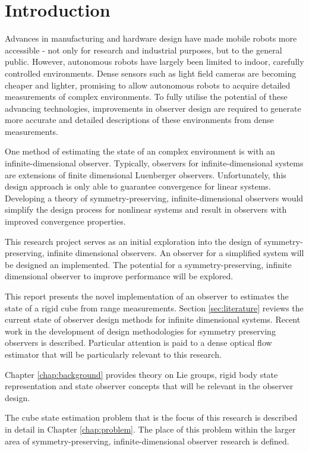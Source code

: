 \chapter{Introduction}

Advances in manufacturing and hardware design have made mobile robots more accessible - not only for research and industrial purposes, but to the general public. However, autonomous robots have largely been limited to indoor, carefully controlled environments. Dense sensors such as light field cameras are becoming cheaper and lighter, promising to allow autonomous robots to acquire detailed measurements of complex environments. To fully utilise the potential of these advancing technologies,  improvements in observer design are required to generate more accurate and detailed descriptions of these environments from dense measurements.

One method of estimating the state of an complex environment is with an infinite-dimensional observer. Typically, observers for infinite-dimensional systems are extensions of finite dimensional Luenberger observers. Unfortunately, this design approach is only able to guarantee convergence for linear systems. Developing a theory of symmetry-preserving, infinite-dimensional observers would simplify the design process for nonlinear systems and result in observers with improved convergence properties.

This research project serves as an initial exploration into the design of symmetry-preserving, infinite dimensional observers. An observer for a simplified system will be designed an implemented. The potential for a symmetry-preserving, infinite dimensional observer to improve performance will be explored. 

This report presents the novel implementation of an observer to estimates the state of a rigid cube from range measurements. Section \ref{sec:literature} reviews the current state of observer design methods for infinite dimensional systems. Recent work in the development of design methodologies for symmetry preserving observers is described. Particular attention is paid to a dense optical flow estimator that will be particularly relevant to this research.
 
Chapter \ref{chap:background} provides theory on Lie groups, rigid body state representation and state observer concepts that will be relevant in the observer design.

The cube state estimation problem that is the focus of this research is described in detail in Chapter \ref{chap:problem}. The place of this problem within the larger area of symmetry-preserving, infinite-dimensional observer research is defined.  

